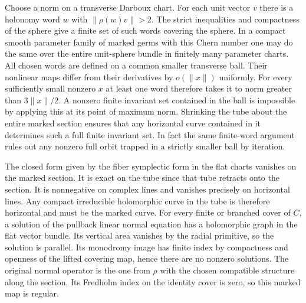 Choose a norm on a transverse Darboux chart. For each unit vector \(v\) there is a holonomy word \(w\) with \(\lVert\rho(w)v\rVert>2\). The strict inequalities and compactness of the sphere give a finite set of such words covering the sphere. In a compact smooth parameter family of marked germs with this Chern number one may do the same over the entire unit-sphere bundle in finitely many parameter charts. All chosen words are defined on a common smaller transverse ball. Their nonlinear maps differ from their derivatives by \(o(\lVert x\rVert)\) uniformly. For every sufficiently small nonzero \(x\) at least one word therefore takes it to norm greater than \(3\lVert x\rVert/2\). A nonzero finite invariant set contained in the ball is impossible by applying this at its point of maximum norm. Shrinking the tube about the entire marked section ensures that any horizontal curve contained in it determines such a full finite invariant set. In fact the same finite-word argument rules out any nonzero full orbit trapped in a strictly smaller ball by iteration.

The closed form given by the fiber symplectic form in the flat charts vanishes on the marked section. It is exact on the tube since that tube retracts onto the section. It is nonnegative on complex lines and vanishes precisely on horizontal lines. Any compact irreducible holomorphic curve in the tube is therefore horizontal and must be the marked curve. For every finite or branched cover of \(C\), a solution of the pullback linear normal equation has a holomorphic graph in the flat vector bundle. Its vertical area vanishes by the radial primitive, so the solution is parallel. Its monodromy image has finite index by compactness and openness of the lifted covering map, hence there are no nonzero solutions. The original normal operator is the one from \(\rho\) with the chosen compatible structure along the section. Its Fredholm index on the identity cover is zero, so this marked map is regular.


